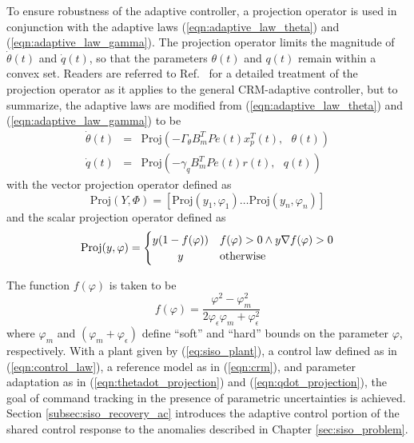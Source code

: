 To ensure robustness of the adaptive controller, a projection operator \cite{pomet1992adaptive, lavretsky2011projection} is used in conjunction with the adaptive laws (\ref{eqn:adaptive_law_theta}) and (\ref{eqn:adaptive_law_gamma}). The projection operator limits the magnitude of $\dot{\theta}(t)$ and $\dot{q}(t)$, so that the parameters $\theta(t)$ and $q(t)$ remain within a convex set. Readers are referred to Ref.~\cite{gibson2013adaptive} for a detailed treatment of the projection operator as it applies to the general CRM-adaptive controller, but to summarize, the adaptive laws are modified from (\ref{eqn:adaptive_law_theta}) and (\ref{eqn:adaptive_law_gamma}) to be
\begin{eqnarray}
	\dot{\theta}(t) &=& \text{Proj}(- \Gamma_\theta B_m^T P e(t) x_p^T(t),\text{ } \theta(t)) \label{eqn:thetadot_projection} \\
	\dot{q}(t) &=& \text{Proj}(- \gamma_q B_m^T P e(t) r(t),\text{ } q(t)) \label{eqn:qdot_projection}
\end{eqnarray}
\noindent with the vector projection operator defined as
\begin{equation}
	\text{Proj}(Y, \Phi) = \left[ \text{Proj}(y_1, \varphi_1) \ldots \text{Proj}(y_n, \varphi_n) \right]
\end{equation}
\noindent and the scalar projection operator defined as
\begin{equation} %
	\text{Proj}(y, \varphi) = \begin{cases}
		y(1 - f(\varphi)) & f(\varphi) > 0 \land y \nabla f(\varphi) > 0\\
		\hfil y & \text{otherwise}
	\end{cases}
\end{equation}

\noindent The function $f(\varphi)$ is taken to be
\begin{equation}
	f(\varphi) = \frac{\varphi^2 - \varphi_{m}^2}{2 \varphi_{\epsilon} \varphi_{m} + \varphi_{\epsilon}^2}
	\label{eqn:proj_function}
\end{equation}
\noindent where $\varphi_{m}$ and $(\varphi_{m} + \varphi_{\epsilon})$ define ``soft'' and ``hard'' bounds on the parameter $\varphi$, respectively. With a plant given by (\ref{eq:siso_plant}), a control law defined as in (\ref{eqn:control_law}), a reference model as in (\ref{eqn:crm}), and parameter adaptation as in (\ref{eqn:thetadot_projection}) and (\ref{eqn:qdot_projection}), the goal of command tracking in the presence of parametric uncertainties is achieved. Section \ref{subsec:siso_recovery_ac} introduces the adaptive control portion of the shared control response to the anomalies described in Chapter \ref{sec:siso_problem}.

